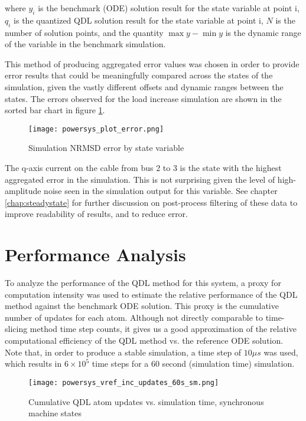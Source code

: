 where $y_i$ is the benchmark (ODE) solution result for the state variable at point i, $q_i$ is the quantized QDL solution result for the state variable at point i, $N$ is the number of solution points, and the quantity $\max{y} - \min{y}$ is the dynamic range of the variable in the benchmark simulation. 
    
This method of producing aggregated error values was chosen in order to provide error results that could be meaningfully compared across the states of the simulation, given the vastly different offsets and dynamic ranges between the states. The errors observed for the load increase simulation are shown in the sorted bar chart in figure \ref{fig:powersys_plot_error}.

\begin{figure}[h]
    \centering
    \texttt{[image: powersys\_plot\_error.png]}
    \caption{Simulation NRMSD error by state variable}
    \label{fig:powersys_plot_error}
\end{figure}

The q-axis current on the cable from bus 2 to 3 is the state with the highest aggregated error in the simulation. This is not surprising given the level of high-amplitude noise seen in the simulation output for this variable. See chapter \ref{chap:steadystate} for further discussion on post-process filtering of these data to improve readability of results, and to reduce error.

\section{Performance Analysis}

To analyze the performance of the QDL method for this system, a proxy for computation intensity was used to estimate the relative performance of the QDL method against the benchmark ODE solution. This proxy is the cumulative number of updates for each atom. Although not directly comparable to time-slicing method time step counts, it gives us a good approximation of the relative computational efficiency of the QDL method vs. the reference ODE solution. Note that, in order to produce a stable simulation, a time step of $10\mu s$ was used, which results in $6 \times 10^{5}$ time steps for a 60 second (simulation time) simulation.  

\begin{figure}[h]
    \centering
    \texttt{[image: powersys\_vref\_inc\_updates\_60s\_sm.png]}
    \caption{Cumulative QDL atom updates vs. simulation time, synchronous machine states}
    \label{fig:powersys_vref_inc_updates_60s_sm}
\end{figure} 

